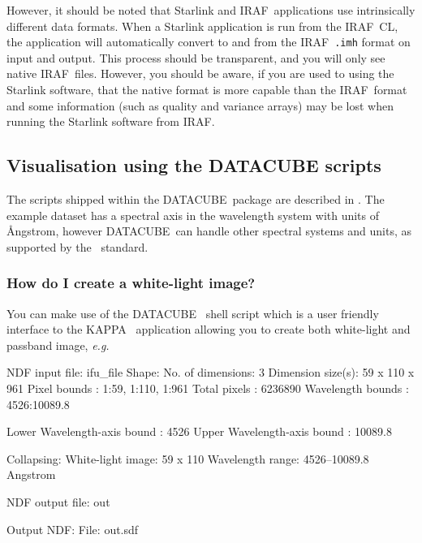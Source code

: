 \documentclass[twoside,11pt]{starlink}
\providecommand{\DATACUBE}{{\footnotesize DATACUBE}\normalsize}
\providecommand{\FITSref}{\htmladdnormallink{FITS}{http://fits.gsfc.nasa.gov/}}
\providecommand{\IRAF}{\footnotesize{IRAF}\normalsize}
\providecommand{\KAPPA}{{\footnotesize KAPPA}\normalsize}
\begin{document}
However, it should be noted that Starlink and \IRAF\ applications use
intrinsically different data formats.  When a Starlink application is
run from the \IRAF\ CL, the application will automatically convert to
and from the \IRAF\ \texttt{.imh} format on input and output.  This process
should be transparent, and you will only see native \IRAF\ files.
However, you should be aware, if you are used to using the Starlink
software, that the native  format is more capable
than the \IRAF\ format and some information (such as quality and
variance arrays) may be lost when running the Starlink software from
\IRAF.

\subsection{Visualisation using the DATACUBE scripts\label{sc16_vis}}

The scripts shipped within the \DATACUBE\ package are described in
.  The example dataset has a spectral axis in
the wavelength system with units of {\AA}ngstrom, however \DATACUBE\ can
handle other spectral systems and units, as supported by the \FITSref\
standard.

\subsubsection{How do I create a white-light image?}

You can make use of the \DATACUBE\ 
shell script which is a user friendly interface to the \KAPPA\
 application allowing you to create
both white-light and passband image, \emph{e.g.}\

\begin{small}
\begin{terminalv}
NDF input file: ifu_file
     Shape:
       No. of dimensions: 3
       Dimension size(s): 59 x 110 x 961
       Pixel bounds     : 1:59, 1:110, 1:961
       Total pixels     : 6236890
       Wavelength bounds : 4526:10089.8

Lower Wavelength-axis bound : 4526
Upper Wavelength-axis bound : 10089.8

     Collapsing:
       White-light image: 59 x 110
       Wavelength range: 4526--10089.8 Angstrom

NDF output file: out

     Output NDF:
       File: out.sdf
%
\end{terminalv}
\end{small}
\end{document}
